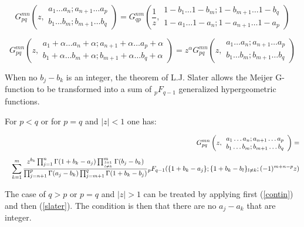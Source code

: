 \documentclass[11pt]{article}
\begin{document}
\begin{equation}\label{contin}
   G^{mn}_{pq}\left(z,\begin{array}{c} a_1\ldots a_n;a_{n+1} \ldots a_p \\ b_1\ldots b_m;b_{m+1} \ldots b_q \end{array} \right)= G^{nm}_{qp}\left(\frac 1 z,\begin{array}{c}1-b_1\ldots 1-b_m;1-b_{m+1} \ldots 1-b_q\\  1-a_1\ldots 1-a_n;1-a_{n+1} \ldots 1-a_p  \end{array} \right)
\end{equation}

\begin{equation} \label{shift}
  G^{mn}_{pq}\left(z,\begin{array}{c} a_1+\alpha\ldots a_n+\alpha;a_{n+1}+\alpha \ldots a_p+\alpha \\ b_1+\alpha\ldots b_m+\alpha;b_{m+1}+\alpha \ldots b_q+\alpha \end{array} \right)=z^\alpha  G^{mn}_{pq}\left(z,\begin{array}{c} a_1\ldots a_n;a_{n+1} \ldots a_p \\ b_1\ldots b_m;b_{m+1} \ldots b_q \end{array} \right)
\end{equation}

When no $b_j-b_k$ is an integer, the theorem of L.J. Slater allows the Meijer 
G-function to be transformed into a sum of ${}_pF_{q-1}$ 
generalized hypergeometric functions.\cite{roach1997} 

For $p<q$ or for $p=q$ and $|z|<1$ one has:

\begin{eqnarray}\label{slater}
&&G^{mn}_{pq}\left(z,\begin{array}{c} a_1\ldots a_n;a_{n+1} \ldots
       a_p \\ b_1\ldots b_m;b_{m+1} \ldots b_q \end{array} \right)= \\[6pt]
&&\sum_{k=1}^m  \frac{ z^{b_k} \prod_{j=1}^n \Gamma(1+b_k-a_j) \prod_{l=1\atop l\ne k}^m \Gamma(b_j-b_k)}{\prod_{j=n+1}^p \Gamma(a_j-b_k) \prod_{j=m+1}^q \Gamma(1+b_k-b_j)} {}_pF_{q-1} (\{1+b_k-a_j\};\{1+b_k-b_l\}_{l\ne k};(-1)^{m+n-p} z)\nonumber
\end{eqnarray}

The case of $q>p$ or $p=q$ and $|z|>1$ can be treated by applying first (\ref{contin}) and then (\ref{slater}). The condition is then that 
there are no $a_j-a_k$ that are integer.
  
\end{document}
